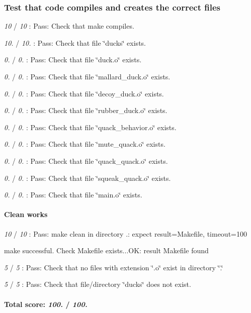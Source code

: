 \subsubsection*{Test that code compiles and creates the correct files}


\begin{DoxyItemize}
\item {\itshape 10} / {\itshape 10} \+: Pass\+: Check that make compiles.
\item {\itshape 10.} / {\itshape 10.} \+: Pass\+: Check that file \char`\"{}ducks\char`\"{} exists.
\item {\itshape 0.} / {\itshape 0.} \+: Pass\+: Check that file \char`\"{}duck.\+o\char`\"{} exists.
\item {\itshape 0.} / {\itshape 0.} \+: Pass\+: Check that file \char`\"{}mallard\+\_\+duck.\+o\char`\"{} exists.
\item {\itshape 0.} / {\itshape 0.} \+: Pass\+: Check that file \char`\"{}decoy\+\_\+duck.\+o\char`\"{} exists.
\item {\itshape 0.} / {\itshape 0.} \+: Pass\+: Check that file \char`\"{}rubber\+\_\+duck.\+o\char`\"{} exists.
\item {\itshape 0.} / {\itshape 0.} \+: Pass\+: Check that file \char`\"{}quack\+\_\+behavior.\+o\char`\"{} exists.
\item {\itshape 0.} / {\itshape 0.} \+: Pass\+: Check that file \char`\"{}mute\+\_\+quack.\+o\char`\"{} exists.
\item {\itshape 0.} / {\itshape 0.} \+: Pass\+: Check that file \char`\"{}quack\+\_\+quack.\+o\char`\"{} exists.
\item {\itshape 0.} / {\itshape 0.} \+: Pass\+: Check that file \char`\"{}squeak\+\_\+quack.\+o\char`\"{} exists.
\item {\itshape 0.} / {\itshape 0.} \+: Pass\+: Check that file \char`\"{}main.\+o\char`\"{} exists.
\end{DoxyItemize}

\paragraph*{Clean works}


\begin{DoxyItemize}
\item {\itshape 10} / {\itshape 10} \+: Pass\+: make \textquotesingle{}clean\textquotesingle{} in directory \textquotesingle{}.\textquotesingle{}\+: expect result=Makefile, timeout=100

make successful. Check Makefile exists...OK\+: result Makefile found
\item {\itshape 5} / {\itshape 5} \+: Pass\+: Check that no files with extension \char`\"{}.\+o\char`\"{} exist in directory \char`\"{}.\char`\"{}
\item {\itshape 5} / {\itshape 5} \+: Pass\+: Check that file/directory \char`\"{}ducks\char`\"{} does not exist.
\end{DoxyItemize}

\paragraph*{Total score\+: {\itshape 100.} / {\itshape 100.}}
